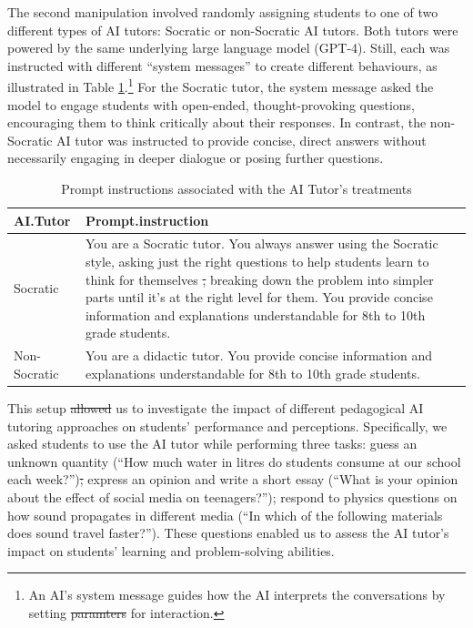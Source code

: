 \documentclass[
  12pt, %
]{article}
\providecommand{\DIFadd}[1]{{\protect\color{blue}\uwave{#1}}} %
\providecommand{\DIFdel}[1]{{\protect\color{red}\sout{#1}}}                      %
\providecommand{\DIFaddbegin}{} %
\providecommand{\DIFaddend}{} %
\providecommand{\DIFdelbegin}{} %
\providecommand{\DIFdelend}{} %
\providecommand{\DIFaddFL}[1]{\DIFadd{#1}} %
\providecommand{\DIFdelFL}[1]{\DIFdel{#1}} %
\providecommand{\DIFaddbeginFL}{} %
\providecommand{\DIFaddendFL}{} %
\providecommand{\DIFdelbeginFL}{} %
\providecommand{\DIFdelendFL}{} %
\newcommand{\DIFscaledelfig}{0.5}
\newlength{\DIFdelgraphicswidth} %
\newlength{\DIFdelgraphicsheight} %
\newcommand{\DIFaddincludegraphics}[2][]{{\color{blue}\fbox{\DIFOincludegraphics[#1]{#2}}}} %
\newcommand{\DIFdelincludegraphics}[2][]{%
\sbox{\DIFdelgraphicsbox}{\DIFOincludegraphics[#1]{#2}}%
\settoboxwidth{\DIFdelgraphicswidth}{\DIFdelgraphicsbox} %
\settoboxtotalheight{\DIFdelgraphicsheight}{\DIFdelgraphicsbox} %
\scalebox{\DIFscaledelfig}{%
\parbox[b]{\DIFdelgraphicswidth}{\usebox{\DIFdelgraphicsbox}\\[-\baselineskip] \rule{\DIFdelgraphicswidth}{0em}}\llap{\resizebox{\DIFdelgraphicswidth}{\DIFdelgraphicsheight}{%
\setlength{\unitlength}{\DIFdelgraphicswidth}%
\begin{picture}(1,1)%
\thicklines\linethickness{2pt} %
{\color[rgb]{1,0,0}\put(0,0){\framebox(1,1){}}}%
{\color[rgb]{1,0,0}\put(0,0){\line( 1,1){1}}}%
{\color[rgb]{1,0,0}\put(0,1){\line(1,-1){1}}}%
\end{picture}%
}\hspace*{3pt}}} %
} %
\DeclareRobustCommand{\DIFaddbegin}{\DIFOaddbegin \let\includegraphics\DIFaddincludegraphics} %
\DeclareRobustCommand{\DIFaddend}{\DIFOaddend \let\includegraphics\DIFOincludegraphics} %
\DeclareRobustCommand{\DIFdelbegin}{\DIFOdelbegin \let\includegraphics\DIFdelincludegraphics} %
\DeclareRobustCommand{\DIFdelend}{\DIFOaddend \let\includegraphics\DIFOincludegraphics} %
\DeclareRobustCommand{\DIFaddbeginFL}{\DIFOaddbeginFL \let\includegraphics\DIFaddincludegraphics} %
\DeclareRobustCommand{\DIFaddendFL}{\DIFOaddendFL \let\includegraphics\DIFOincludegraphics} %
\DeclareRobustCommand{\DIFdelbeginFL}{\DIFOdelbeginFL \let\includegraphics\DIFdelincludegraphics} %
\DeclareRobustCommand{\DIFdelendFL}{\DIFOaddendFL \let\includegraphics\DIFOincludegraphics} %
\begin{document}
The second manipulation involved randomly assigning students to one of two different types of AI tutors: Socratic or non-Socratic AI tutors. Both tutors were powered by the same underlying large language model (GPT-4). Still, each was instructed with different ``system messages'' to create different behaviours, as illustrated in Table \ref{tab:prompts}.\footnote{An AI's system message guides how the AI interprets the conversations by setting \DIFdelbegin \DIFdel{paramters }\DIFdelend \DIFaddbegin \DIFadd{parameters }\DIFaddend for interaction.} For the Socratic tutor, the system message asked the model to engage students with open-ended, thought-provoking questions, encouraging them to think critically about their responses. In contrast, the non-Socratic AI tutor was instructed to provide concise, direct answers without necessarily engaging in deeper dialogue or posing further questions.
\begin{table}

\caption{\label{tab:prompts}Prompt instructions associated with the AI Tutor's treatments}
\centering
\begin{tabular}[t]{l>{\raggedright\arraybackslash}p{4in}}
\toprule
AI.Tutor & Prompt.instruction\\
\midrule
Socratic & You are a Socratic tutor. You always answer using the Socratic style, asking just the right questions to help students learn to think for themselves \DIFdelbeginFL \DIFdelFL{, }\DIFdelendFL \DIFaddbeginFL \DIFaddFL{and }\DIFaddendFL breaking down the problem into simpler parts until it's at the right level for them. You provide concise information and explanations understandable for 8th to 10th grade students.\\
Non-Socratic & You are a didactic tutor. You provide concise information and explanations understandable for 8th to 10th grade students.\\
\bottomrule
\end{tabular}

\end{table}

This setup \DIFdelbegin \DIFdel{allowed }\DIFdelend \DIFaddbegin \DIFadd{allows }\DIFaddend us to investigate the impact of different pedagogical AI tutoring approaches on students' performance and perceptions. Specifically, we asked students to use the AI tutor while performing three tasks: guess an unknown quantity (``How much water in litres do students consume at our school each week?'')\DIFdelbegin \DIFdel{; }\DIFdelend \DIFaddbegin \DIFadd{, }\DIFaddend express an opinion and write a short essay (``What is your opinion about the effect of social media on teenagers?''); respond to physics questions on how sound propagates in different media (``In which of the following materials does sound travel faster?''). These questions enabled us to assess the AI tutor's impact on students' learning and problem-solving abilities.
\end{document}

